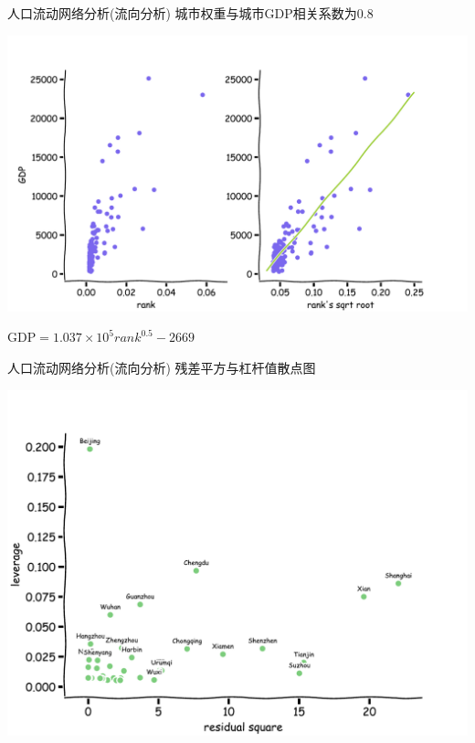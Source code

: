 \begin{frame}[t]{人口流动网络分析(流向分析)}
    城市权重与城市GDP相关系数为0.8

    \pause
    \includegraphics[scale=0.4]{figures/rank_gdp_scatter.pdf}

    $\text{GDP} = 1.037\times 10^5 rank^{0.5}-2669$
\end{frame}

\begin{frame}[t]{人口流动网络分析(流向分析)}
    残差平方与杠杆值散点图

    \includegraphics[scale=0.4]{figures/leverage.pdf}
\end{frame}

